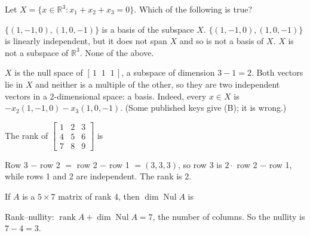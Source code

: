 
\begin{question}[id=gate-cs2007-1, source=GATE CS 2007, marks=2]
Let $X = \{x \in \mathbb{R}^3 : x_1 + x_2 + x_3 = 0\}$. Which of the following is true?
\begin{options}
  \correct $\{(1, -1, 0), (1, 0, -1)\}$ is a basis of the subspace $X$.
  \option $\{(1, -1, 0), (1, 0, -1)\}$ is linearly independent, but it does not span $X$ and so is not a basis of $X$.
  \option $X$ is not a subspace of $\mathbb{R}^3$.
  \option None of the above.
\end{options}
\begin{solution}
$X$ is the null space of $[\,1 \;\; 1 \;\; 1\,]$, a subspace of dimension $3 - 1 = 2$. Both vectors lie in $X$ and neither is a multiple of the other, so they are two independent vectors in a 2-dimensional space: a basis. Indeed, every $x \in X$ is $-x_2(1, -1, 0) - x_3(1, 0, -1)$. (Some published keys give (B); it is wrong.)
\end{solution}
\end{question}


\begin{question}[id=rank-1]
The rank of $\begin{bmatrix} 1 & 2 & 3 \\ 4 & 5 & 6 \\ 7 & 8 & 9 \end{bmatrix}$ is
\begin{solution}
Row 3 $-$ row 2 $=$ row 2 $-$ row 1 $= (3, 3, 3)$, so row 3 is $2 \cdot$ row 2 $-$ row 1, while rows 1 and 2 are independent. The rank is 2.
\end{solution}
\end{question}

\begin{question}[id=rank-2]
If $A$ is a $5 \times 7$ matrix of rank 4, then $\dim \operatorname{Nul} A$ is
\begin{options}
\end{options}
\begin{solution}
Rank--nullity: $\operatorname{rank} A + \dim \operatorname{Nul} A = 7$, the number of columns. So the nullity is $7 - 4 = 3$.
\end{solution}
\end{question}


